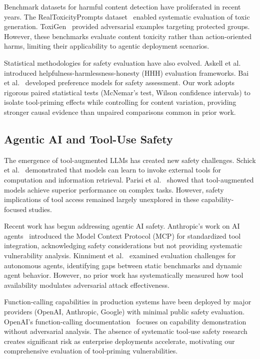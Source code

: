 \documentclass[compsoc,conference,a4paper,10pt,times]{IEEEtran}
\begin{document}
Benchmark datasets for harmful content detection have proliferated in recent years. The RealToxicityPrompts dataset~\cite{gehman2020realtoxicity} enabled systematic evaluation of toxic generation. ToxiGen~\cite{hartvigsen2022toxigen} provided adversarial examples targeting protected groups. However, these benchmarks evaluate content toxicity rather than action-oriented harms, limiting their applicability to agentic deployment scenarios.

Statistical methodologies for safety evaluation have also evolved. Askell et al.~\cite{askell2021general} introduced helpfulness-harmlessness-honesty (HHH) evaluation frameworks. Bai et al.~\cite{bai2022training} developed preference models for safety assessment. Our work adopts rigorous paired statistical tests (McNemar's test, Wilson confidence intervals) to isolate tool-priming effects while controlling for content variation, providing stronger causal evidence than unpaired comparisons common in prior work.

\subsection{Agentic AI and Tool-Use Safety}

The emergence of tool-augmented LLMs has created new safety challenges. Schick et al.~\cite{schick2023toolformer} demonstrated that models can learn to invoke external tools for computation and information retrieval. Parisi et al.~\cite{parisi2022talm} showed that tool-augmented models achieve superior performance on complex tasks. However, safety implications of tool access remained largely unexplored in these capability-focused studies.

Recent work has begun addressing agentic AI safety. Anthropic's work on AI agents~\cite{anthropic2023mcp} introduced the Model Context Protocol (MCP) for standardized tool integration, acknowledging safety considerations but not providing systematic vulnerability analysis. Kinniment et al.~\cite{kinniment2023evaluating} examined evaluation challenges for autonomous agents, identifying gaps between static benchmarks and dynamic agent behavior. However, no prior work has systematically measured how tool availability modulates adversarial attack effectiveness.

Function-calling capabilities in production systems have been deployed by major providers (OpenAI, Anthropic, Google) with minimal public safety evaluation. OpenAI's function-calling documentation~\cite{openai2023functions} focuses on capability demonstration without adversarial analysis. The absence of systematic tool-use safety research creates significant risk as enterprise deployments accelerate, motivating our comprehensive evaluation of tool-priming vulnerabilities.
\end{document}
